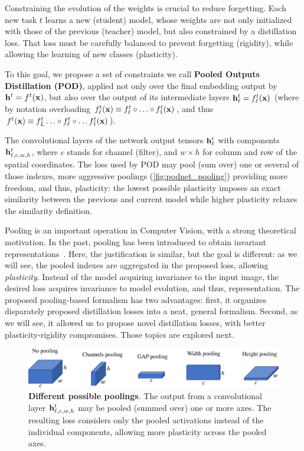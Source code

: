 Constraining the evolution of the weights is crucial to reduce forgetting. Each new task $t$ learns
a new (student) model, whose weights are not only initialized with those of the previous (teacher)
model, but also constrained by a distillation loss. That loss must be carefully balanced to prevent
forgetting (rigidity), while allowing the learning of new classes (plasticity).

To this goal, we propose a set of constraints we call \textbf{Pooled Outputs Distillation (POD)},
applied not only over the final embedding output by $\mathbf{h}^{t}=f^{t}(\mathbf{x})$, but also over the output
of its intermediate layers $\mathbf{h}^{t}_\ell=f^{t}_\ell(\mathbf{x})$ (where by notation overloading
$f^{t}_\ell(\mathbf{x})\equiv f^{t}_\ell\circ\ldots\circ f^{t}_1(\mathbf{x})$, and thus $f^{t}(\mathbf{x})\equiv
    f^{t}_L\ldots\circ f^{t}_\ell\circ\ldots f^{t}_1(\mathbf{x})$).

The convolutional layers of the network output tensors $\mathbf{h}^{t}_{\ell}$ with components
$\mathbf{h}^{t}_{\ell,c,w,h}$, where $c$ stands for channel (filter), and $w\times h$ for column and row of
the spatial coordinates. The loss used by POD may pool (sum over) one or several of those indexes,
more aggressive poolings (\autoref{fig:podnet_pooling}) providing more freedom, and thus,
plasticity: the lowest possible plasticity imposes an exact similarity between the previous and
current model while higher plasticity relaxes the similarity definition.

Pooling is an important operation in Computer Vision, with a strong theoretical motivation. In the
past, pooling has been introduced to obtain invariant
representations~\citep{lowe1999sift,lazbnik2006spatial_pyramid_matching}. Here, the justification is
similar, but the goal is different: as we will see, the pooled indexes are aggregated in the
proposed loss, allowing \textit{plasticity}. Instead of the model acquiring invariance to the input
image, the desired loss acquires invariance to model evolution, and thus, representation.
%
The proposed pooling-based formalism has two advantages: first, it organizes disparately proposed
distillation losses into a neat, general formalism. Second, as we will see, it allowed us to propose
novel distillation losses, with better plasticity-rigidity compromises. Those topics are explored
next.

\begin{figure}[tb]
    \begin{center}
        \includegraphics[width=0.90\linewidth]{images/podnet/pooling}
    \end{center}
    \caption{\textbf{Different possible poolings}. The output from a convolutional layer
        $\mathbf{h}^{t}_{\ell,c,w,h}$ may be pooled (summed over) one or more axes. The resulting loss
        considers only the pooled activations instead of the individual components, allowing more
        plasticity across the pooled axes.}
    \label{fig:podnet_pooling}
\end{figure}

